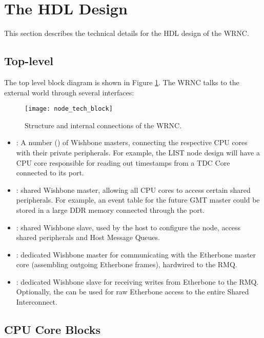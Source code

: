 \documentclass{article}
\begin{document}
\section{The HDL Design}

This section describes the technical details for the HDL design of the WRNC.

\subsection{Top-level}

The top level block diagram is shown in Figure \ref{fig:node_tech_block}. The WRNC talks to the external world through several interfaces:

\begin{figure}[htb]
\centering
\texttt{[image: node\_tech\_block]}
\caption{Structure and internal connections of the WRNC.}
\label{fig:node_tech_block}
\end{figure}


\begin{itemize}
\item {}: A number () of Wishbone masters, connecting the respective CPU cores with their private peripherals. For example, the LIST node design will have a CPU core responsible for
  reading out timestamps from a TDC Core connected to its  port.

\item {}: shared Wishbone master, allowing all CPU cores to access certain shared peripherals. For example, an event table for the future GMT master could be stored in a large DDR memory connected through the  port.
\item {}: shared Wishbone slave, used by the host to configure the node, access shared peripherals and Host Message Queues.
\item {}: dedicated Wishbone master for communicating with the Etherbone master core (assembling outgoing Etherbone frames), hardwired to the RMQ.
\item {}: dedicated Wishbone slave for receiving writes from Etherbone to the RMQ. Optionally, the  can be used for raw Etherbone access to the entire Shared Interconnect.


\end{itemize}


\newpage
\subsection{CPU Core Blocks}
\end{document}
